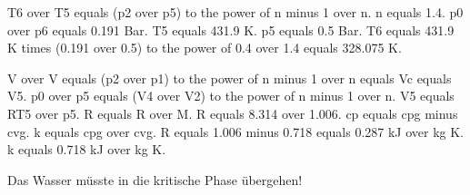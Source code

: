 T6 over T5 equals (p2 over p5) to the power of n minus 1 over n. 
n equals 1.4.
p0 over p6 equals 0.191 Bar.
T5 equals 431.9 K.
p5 equals 0.5 Bar.
T6 equals 431.9 K times (0.191 over 0.5) to the power of 0.4 over 1.4 equals 328.075 K.

V over V equals (p2 over p1) to the power of n minus 1 over n equals Vc equals V5.
p0 over p5 equals (V4 over V2) to the power of n minus 1 over n.
V5 equals RT5 over p5.
R equals R over M.
R equals 8.314 over 1.006.
cp equals cpg minus cvg.
k equals cpg over cvg.
R equals 1.006 minus 0.718 equals 0.287 kJ over kg K.
k equals 0.718 kJ over kg K.

Das Wasser müsste in die kritische Phase übergehen!